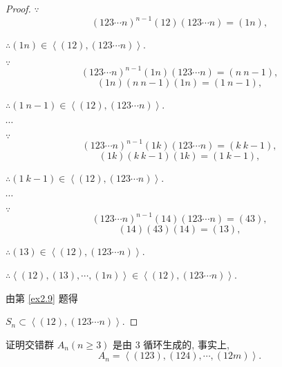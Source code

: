 \documentclass{ctexart}
\begin{document}
\begin{proof}
    $\because$
    \[(123\cdots n)^{n-1}(12)(123\cdots n)=(1n),\]

    $\therefore(1n)\in\left<(12),(123\cdots n)\right>$.

    $\because$
    \[(123\cdots n)^{n-1}(1n)(123\cdots n)=(n\ n-1),\]
    \[(1n)(n\ n-1)(1n)=(1\ n-1),\]

    $\therefore(1\ n-1)\in\left<(12),(123\cdots n)\right>$.

    $\cdots$

    $\because$
    \[(123\cdots n)^{n-1}(1k)(123\cdots n)=(k\ k-1),\]
    \[(1k)(k\ k-1)(1k)=(1\ k-1),\]

    $\therefore(1\ k-1)\in\left<(12),(123\cdots n)\right>$.

    $\cdots$

    $\because$
    \[(123\cdots n)^{n-1}(14)(123\cdots n)=(43),\]
    \[(14)(43)(14)=(13),\]

    $\therefore(13)\in\left<(12),(123\cdots n)\right>$.

    $\therefore\left<(12),(13),\cdots,(1n)\right>\in\left<(12),(123\cdots n)\right>$.

    由第 \ref{ex2.9} 题得

    $S_n\subset\left<(12),(123\cdots n)\right>$.
\end{proof}
\begin{exercise}[2.11]
    证明交错群 $A_n(n\geq3)$ 是由 $3$ 循环生成的, 事实上,
    \[A_n=\left<(123),(124),\cdots,(12m)\right>.\]
\end{exercise}
\end{document}
